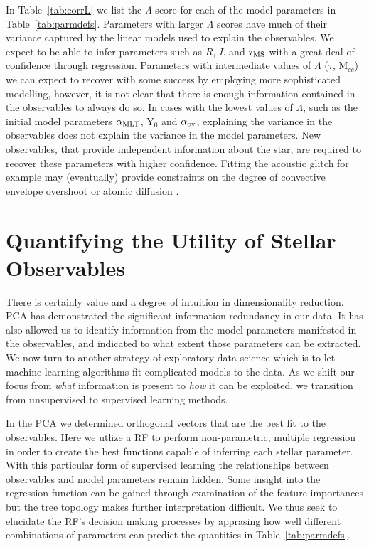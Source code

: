 In Table~\ref{tab:corrL} we list the $\Lambda$ score for each of the model parameters in Table~\ref{tab:parmdefs}. Parameters with larger $\Lambda$ scores have much of their variance captured by the linear models used to explain the observables.  We expect  to be able to infer parameters such as $R$, $L$ and $\tau_{\rm{MS}}$ with a great deal of confidence through regression. 
Parameters with intermediate values of $\Lambda$ ($\tau$, M$_{cc}$) we can expect to recover with some success by employing more sophisticated modelling, however, it is not clear that there is enough information contained in the observables to always do so. In cases with the lowest values of $\Lambda$, such as the initial model parameters $\alpha_{\rm{MLT}}$, Y$_0$ and $\alpha_{\rm{ov}}$, explaining the variance in the observables does not explain the variance in the model parameters. New observables, that provide independent information about the star, are required to recover these parameters with higher confidence. Fitting the acoustic glitch for example may (eventually) provide constraints on the degree of convective envelope overshoot or atomic diffusion \citep{2017ApJ...837...47V}. 





\section{Quantifying the Utility of Stellar Observables} 
\label{sec:qu}

There is certainly value and a degree of intuition in dimensionality reduction.
PCA has demonstrated the significant information redundancy in our data. 
It has also allowed us to identify information from the model parameters manifested in the observables, and indicated to what extent those parameters can be extracted.  
We now turn to another strategy of exploratory data science which is to let machine learning algorithms fit complicated models to the data. As we shift our focus from \emph{what} information is present to \emph{how} it can be exploited, we transition from unsupervised to supervised learning methods. 


In the PCA we determined orthogonal vectors that are the best fit to the observables. 
Here we utlize a RF to perform non-parametric, multiple regression in order to create the best functions capable of inferring each stellar parameter. With this particular form of supervised learning 
the relationships between observables and model parameters remain hidden. Some insight into the regression function can be gained through examination of the feature importances but the tree topology makes further interpretation difficult. We thus seek to elucidate the RF's decision making processes by apprasing
 how well different combinations of parameters can predict the quantities in Table~\ref{tab:parmdefs}. 
 
